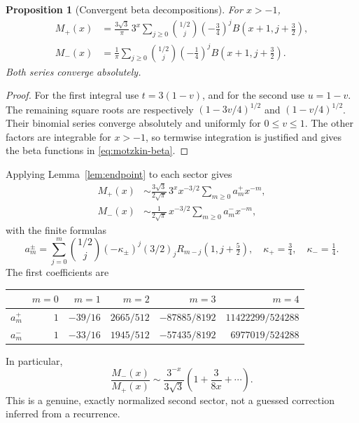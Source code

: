 \documentclass[11pt,a4paper]{article}
\numberwithin{equation}{section}
\newtheorem{proposition}[theorem]{Proposition}
\theoremstyle{definition}
\theoremstyle{remark}
\newcommand{\rising}[2]{(#1)_{#2}}
\begin{document}
\begin{proposition}[Convergent beta decompositions]
\label{prop:motzkin-beta}
For $x>-1$,
\begin{align}
 M_+(x)&=\frac{3\sqrt3}{\pi}\,3^x
    \sum_{j\ge0}\binom{1/2}{j}\left(-\frac34\right)^j
          B(x+1,j+\tfrac32),\nonumber\\
 M_-(x)&=\frac1\pi
    \sum_{j\ge0}\binom{1/2}{j}\left(-\frac14\right)^j
          B(x+1,j+\tfrac32).
 \label{eq:motzkin-beta}
\end{align}
Both series converge absolutely.
\end{proposition}
\begin{proof}
For the first integral use $t=3(1-v)$, and for the second use $u=1-v$. The remaining square roots are respectively $(1-3v/4)^{1/2}$ and $(1-v/4)^{1/2}$. Their binomial series converge absolutely and uniformly for $0\le v\le1$. The other factors are integrable for $x>-1$, so termwise integration is justified and gives the beta functions in \eqref{eq:motzkin-beta}.
\end{proof}

Applying Lemma~\ref{lem:endpoint} to each sector gives
\begin{align}
 M_+(x)&\sim\frac{3\sqrt3}{2\sqrt\pi}\,3^xx^{-3/2}
                         \sum_{m\ge0}a_m^+x^{-m},\nonumber\\
 M_-(x)&\sim\frac1{2\sqrt\pi}\,x^{-3/2}
                         \sum_{m\ge0}a_m^-x^{-m},
 \label{eq:motzkin-asymp}
\end{align}
with the finite formulas
\begin{equation}
 a_m^\pm=\sum_{j=0}^m\binom{1/2}{j}(-\kappa_\pm)^j
       \rising{3/2}{j}R_{m-j}(1,j+\tfrac52),
 \quad \kappa_+=\tfrac34,\quad\kappa_-=\tfrac14.
 \label{eq:motzkin-coeff}
\end{equation}
The first coefficients are
\begin{center}
\begin{tabular}{c@{\qquad}rrrrr}
\toprule
 & $m=0$&$m=1$&$m=2$&$m=3$&$m=4$\\\midrule
$a_m^+$&$1$&$-39/16$&$2665/512$&$-87885/8192$&$11422299/524288$\\[2pt]
$a_m^-$&$1$&$-33/16$&$1945/512$&$-57435/8192$&$6977019/524288$\\\bottomrule
\end{tabular}
\end{center}
In particular,
\begin{equation}
 \frac{M_-(x)}{M_+(x)}
 \sim\frac{3^{-x}}{3\sqrt3}\left(1+\frac3{8x}+\cdots\right).
 \label{eq:motzkin-ratio}
\end{equation}
This is a genuine, exactly normalized second sector, not a guessed correction inferred from a recurrence.
\end{document}
